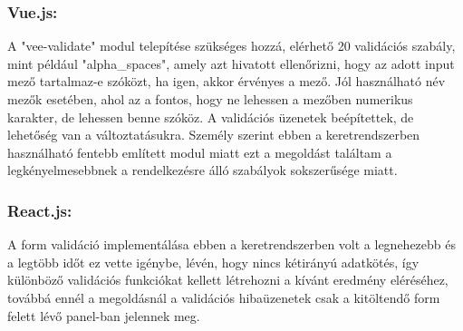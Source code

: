 \subsubsection{Vue.js:} A "vee-validate" modul telepítése szükséges hozzá, elérhető 20 validációs szabály, mint például "alpha\_spaces", amely azt hivatott ellenőrizni, hogy az adott input mező tartalmaz-e szóközt, ha igen, akkor érvényes a mező. Jól használható név mezők esetében, ahol az a fontos, hogy ne lehessen a mezőben numerikus karakter, de lehessen benne szóköz. A validációs üzenetek beépítettek, de lehetőség van a változtatásukra. Személy szerint ebben a keretrendszerben használható fentebb említett modul miatt ezt a megoldást találtam a legkényelmesebbnek a rendelkezésre álló szabályok sokszerűsége miatt.\\
\subsubsection{React.js:} A form validáció implementálása ebben a keretrendszerben volt a legnehezebb és a legtöbb időt ez vette igénybe, lévén, hogy nincs kétirányú adatkötés, így különböző validációs funkciókat kellett létrehozni a kívánt eredmény eléréséhez, továbbá ennél a megoldásnál a validációs hibaüzenetek csak a kitöltendő form felett lévő panel-ban jelennek meg.\\


